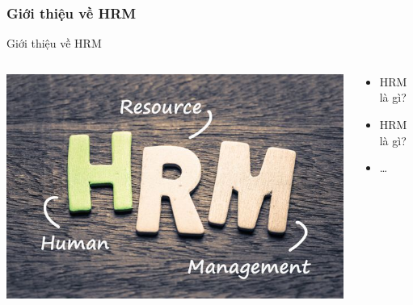 \documentclass{beamer}
\begin{document}
\subsubsection{Giới thiệu về HRM}
\begin{frame}{Giới thiệu về HRM}
\begin{columns}

\begin{column}{0.4\textwidth}
\includegraphics[width=\textwidth]{pictures/Giới thiệu về HRM.png}
\end{column}

\begin{column}{0.6\textwidth}
\begin{itemize}
\item HRM là gì?
\item HRM là gì?
\item \dots
\end{itemize}
\end{column}

\end{columns}
\end{frame}

\end{document}
